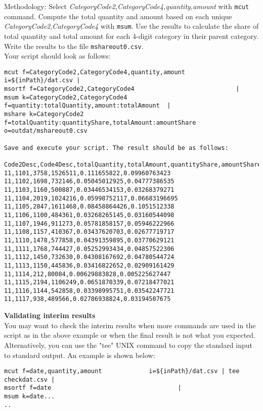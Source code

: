 Methodology: Select \emph{CategoryCode2,CategoryCode4,quantity,amount} with \verb|mcut| command. Compute the total quantity and amount based on each unique \emph{CategoryCode2,CategoryCode4} with \verb|msum|. Use the results to calculate the share of total quantity and total amount for each 4-digit category in their parent category. Write the results to the file \verb|mshareout0.csv|. \\

Your script should look as follows:\\

\begin{verbatim}
mcut f=CategoryCode2,CategoryCode4,quantity,amount      i=${inPath}/dat.csv |
msortf f=CategoryCode2,CategoryCode4                            |       
msum k=CategoryCode2,CategoryCode4 f=quantity:totalQuantity,amount:totalAmount  |
mshare k=CategoryCode2 f=totalQuantity:quantityShare,totalAmount:amountShare o=outdat/mshareout0.csv

Save and execute your script. The result should be as follows:

Code2Desc,Code4Desc,totalQuantity,totalAmount,quantityShare,amountShare
11,1101,3758,1526511,0.111655822,0.09960763423
11,1102,1698,732146,0.05045012925,0.04777386535
11,1103,1160,500887,0.03446534153,0.03268379271
11,1104,2019,1024216,0.05998752117,0.06683196695
11,1105,2847,1611468,0.08458864426,0.1051512338
11,1106,1100,484361,0.03268265145,0.03160544098
11,1107,1946,911273,0.05781858157,0.05946222966
11,1108,1157,410367,0.03437620703,0.02677719717
11,1110,1478,577858,0.04391359895,0.03770629121
11,1111,1768,744427,0.05252993434,0.04857522306
11,1112,1450,732630,0.04308167692,0.04780544724
11,1113,1150,445836,0.03416822652,0.02909161429
11,1114,212,80084,0.00629883828,0.005225627447
11,1115,2194,1106249,0.0651870339,0.07218477021
11,1116,1144,542858,0.03398995751,0.03542247721
11,1117,938,489566,0.02786938824,0.03194507675
\end{verbatim}

\vspace {5mm}

{\setlength{\parindent}{0cm}

\textbf{Validating interim results}\\

    
You may want to check the interim results when more commands are used in the script as in the above example or when the final result is not what you expected. Alternatively, you can use the "tee" UNIX command to copy the standard input to standard output. An example is shown below:  \\

}
\begin{verbatim}
mcut f=date,quantity,amount             i=${inPath}/dat.csv | tee checkdat.csv |
msortf f=date                           		|
msum k=date...
..         
\end{verbatim}

